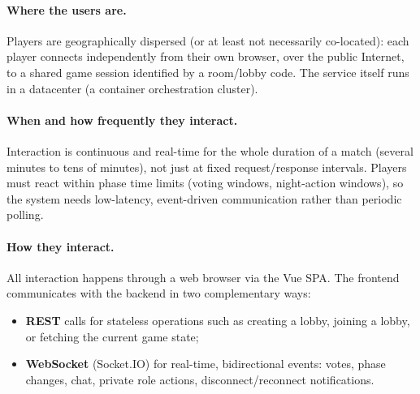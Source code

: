 \documentclass{scrartcl}
\begin{document}
\paragraph{Where the users are.}
Players are geographically dispersed (or at least not necessarily co-located):
each player connects independently from their own browser, over the public
Internet, to a shared game session identified by a room/lobby code. The service
itself runs in a datacenter (a container orchestration cluster).

\paragraph{When and how frequently they interact.}
Interaction is continuous and real-time for the whole duration of a match
(several minutes to tens of minutes), not just at fixed request/response
intervals. Players must react within phase time limits (voting windows,
night-action windows), so the system needs low-latency, event-driven
communication rather than periodic polling.

\paragraph{How they interact.}
All interaction happens through a web browser via the Vue SPA. The frontend
communicates with the backend in two complementary ways:
\begin{itemize}
      \item \textbf{REST} calls for stateless operations such as creating a lobby,
            joining a lobby, or fetching the current game state;
      \item \textbf{WebSocket} (Socket.IO) for real-time, bidirectional events:
            votes, phase changes, chat, private role actions, disconnect/reconnect
            notifications.
\end{itemize}
\end{document}
